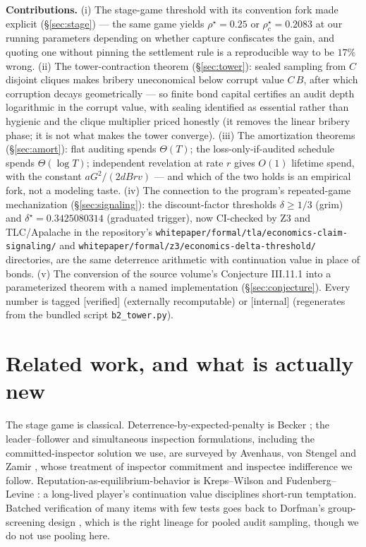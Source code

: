 \documentclass[11pt,a4paper]{article}
\begin{document}
\textbf{Contributions.} (i) The stage-game threshold with its convention fork made explicit (\S\ref{sec:stage}) --- the same game yields $\rho^\star=0.25$ or $\rho^\star_c=0.2083$ at our running parameters depending on whether capture confiscates the gain, and quoting one without pinning the settlement rule is a reproducible way to be $17\%$ wrong. (ii) The tower-contraction theorem (\S\ref{sec:tower}): sealed sampling from $C$ disjoint cliques makes bribery uneconomical below corrupt value $C\,B$, after which corruption decays geometrically --- so finite bond capital certifies an audit depth logarithmic in the corrupt value, with sealing identified as essential rather than hygienic and the clique multiplier priced honestly (it removes the linear bribery phase; it is not what makes the tower converge). (iii) The amortization theorems (\S\ref{sec:amort}): flat auditing spends $\Theta(T)$; the loss-only-if-audited schedule spends $\Theta(\log T)$; independent revelation at rate $r$ gives $O(1)$ lifetime spend, with the constant $aG^2/(2dBrv)$ --- and which of the two holds is an empirical fork, not a modeling taste. (iv) The connection to the program's repeated-game mechanization (\S\ref{sec:signaling}): the discount-factor thresholds $\delta \ge 1/3$ (grim) and $\delta^\star = 0.3425080314$ (graduated trigger), now CI-checked by Z3 and TLC/Apalache in the repository's \texttt{whitepaper/formal/tla/economics-claim-signaling/} and \texttt{whitepaper/formal/z3/economics-delta-threshold/} directories, are the same deterrence arithmetic with continuation value in place of bonds. (v) The conversion of the source volume's Conjecture III.11.1 into a parameterized theorem with a named implementation (\S\ref{sec:conjecture}). Every number is tagged [verified] (externally recomputable) or [internal] (regenerates from the bundled script \texttt{b2\_tower.py}).

\section{Related work, and what is actually new}\label{sec:related}
The stage game is classical. Deterrence-by-expected-penalty is Becker \cite{becker1968}; the leader--follower and simultaneous inspection formulations, including the committed-inspector solution we use, are surveyed by Avenhaus, von Stengel and Zamir \cite{avz2002}, whose treatment of inspector commitment and inspectee indifference we follow. Reputation-as-equilibrium-behavior is Kreps--Wilson \cite{krepswilson1982} and Fudenberg--Levine \cite{fudenberglevine1989}: a long-lived player's continuation value disciplines short-run temptation. Batched verification of many items with few tests goes back to Dorfman's group-screening design \cite{dorfman1943}, which is the right lineage for pooled audit sampling, though we do not use pooling here.
\end{document}
